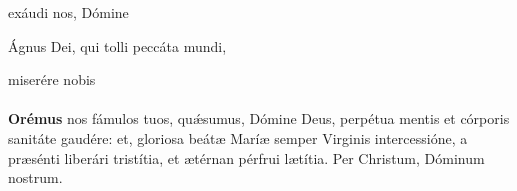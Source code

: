 {\hspace*{\fill}}exáudi nos, Dómine

Ágnus Dei, qui tolli peccáta mundi, 

{\hspace*{\fill}}miserére nobis\\[2mm]
\\

\textbf{Orémus}
nos fámulos tuos, qu{\'\ae}sumus, Dómine Deus, perpétua mentis et córporis sanitáte gaudére: et, gloriosa beát{\ae}
Marí{\ae} semper Virginis intercessióne, a pr{\ae}sénti liberári tristítia, et {\ae}térnan pérfrui l{\ae}títia. Per Christum, Dóminum nostrum.\\
